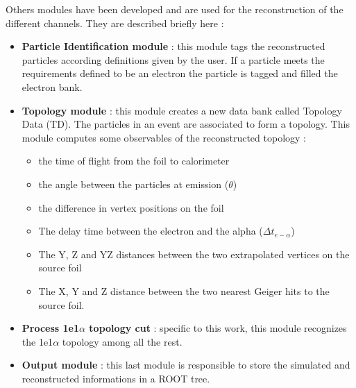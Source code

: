 \documentclass[main.tex]{subfiles}
\begin{document}
\noindent Others modules have been developed and are used for the reconstruction of the different channels. They are described briefly here :


\begin{itemize}


\item \textbf{Particle Identification module} : this module tags the reconstructed particles according definitions given by the user. If a particle meets the requirements defined to be an electron the particle is tagged and filled the electron bank. %


\item \textbf{Topology module} : this module creates a new data bank called Topology Data (TD). The particles in an event are associated to form a topology. This module computes some observables of the reconstructed topology : 

 
\begin{itemize}


\item the time of flight from the foil to calorimeter
\item the angle between the particles at emission ($\theta$)
\item the difference in vertex positions on the foil
\item The delay time between the electron and the alpha ($\Delta t_{e-\alpha}$)
\item The Y, Z and YZ distances between the two extrapolated vertices on the source foil
\item The X, Y and Z distance between the two nearest Geiger hits to the source foil.


\end{itemize}


\item \textbf{Process 1e1$\alpha$ topology cut} : specific to this work, this module recognizes the 1e1$\alpha$ topology among all the rest.%


\item \textbf{Output module} : this last module is responsible to store the simulated and reconstructed informations in a ROOT tree.


\end{itemize}


\FloatBarrier
\end{document}
